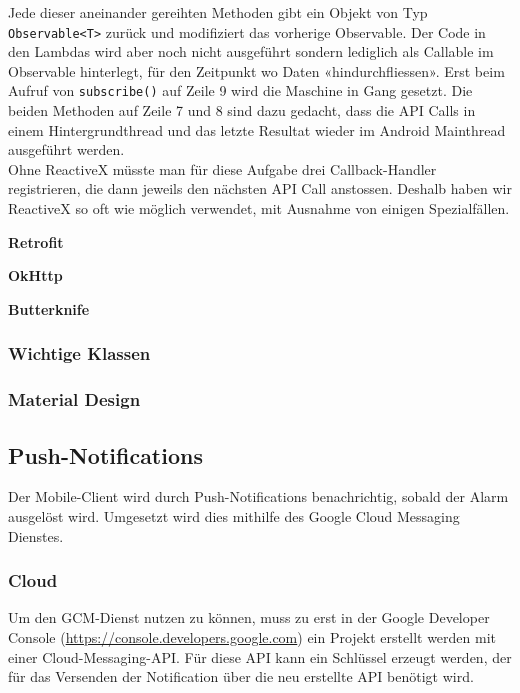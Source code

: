 Jede dieser aneinander gereihten Methoden gibt ein Objekt von Typ \lstinline!Observable<T>! zurück und modifiziert das vorherige Observable. Der Code in den Lambdas wird aber noch nicht ausgeführt sondern lediglich als Callable im Observable hinterlegt, für den Zeitpunkt wo Daten «hindurchfliessen». Erst beim Aufruf von \lstinline!subscribe()! auf Zeile 9 wird die Maschine in Gang gesetzt. Die beiden Methoden auf Zeile 7 und 8 sind dazu gedacht, dass die API Calls in einem Hintergrundthread und das letzte Resultat wieder im Android Mainthread ausgeführt werden. \\
Ohne ReactiveX müsste man für diese Aufgabe drei Callback-Handler registrieren, die dann jeweils den nächsten API Call anstossen. Deshalb haben wir ReactiveX so oft wie möglich verwendet, mit Ausnahme von einigen Spezialfällen. 


\tbd

\textbf{Retrofit} \\
\tbd

\textbf{OkHttp} \\
\tbd

\textbf{Butterknife} \\
\tbd

\subsubsection{Wichtige Klassen}

\subsubsection{Material Design}

\subsection{Push-Notifications}
\label{sec:notificationRealization}
Der Mobile-Client wird durch Push-Notifications benachrichtig, sobald der Alarm ausgelöst wird. Umgesetzt wird dies mithilfe des Google Cloud Messaging Dienstes.

\subsubsection{Cloud}
Um den GCM-Dienst nutzen zu können, muss zu erst in der Google Developer Console (\url{https://console.developers.google.com}) ein Projekt erstellt werden mit einer Cloud-Messaging-API. Für diese API kann ein Schlüssel erzeugt werden, der für das Versenden der Notification über die neu erstellte API benötigt wird.

